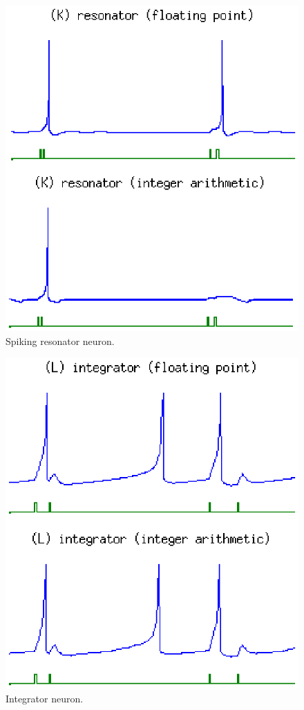 \documentclass[journal]{./sty/IEEEtran}
\begin{document}
\begin{figure}
\centering
\includegraphics[scale=0.6]{imgs/izh_resonator}
\caption{Spiking resonator neuron.\label{fig:reson8r}}
\end{figure}

\begin{figure}
\centering
\includegraphics[scale=0.6]{imgs/izh_integrator}
\caption{Integrator neuron.\label{fig:integr8r}}
\end{figure}
\end{document}
